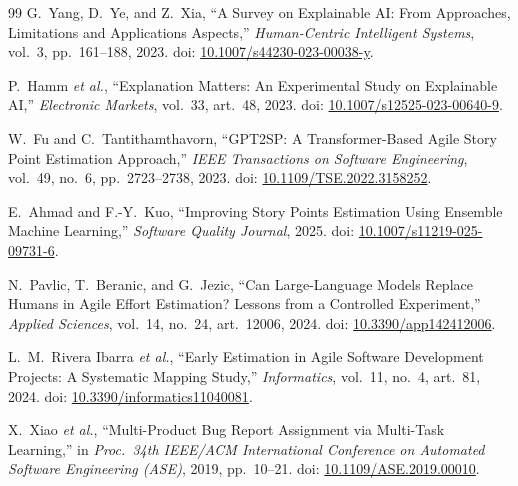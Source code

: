 \documentclass[conference]{IEEEtran}
\begin{document}
\begin{thebibliography}{99}
G.\ Yang, D.\ Ye, and Z.\ Xia,
``A Survey on Explainable AI: From Approaches, Limitations and Applications
Aspects,''
\emph{Human-Centric Intelligent Systems},
vol.~3, pp.~161--188, 2023.
doi: \href{https://doi.org/10.1007/s44230-023-00038-y}{10.1007/s44230-023-00038-y}.

P.\ Hamm \emph{et al.},
``Explanation Matters: An Experimental Study on Explainable AI,''
\emph{Electronic Markets},
vol.~33, art.~48, 2023.
doi: \href{https://doi.org/10.1007/s12525-023-00640-9}{10.1007/s12525-023-00640-9}.

W.\ Fu and C.\ Tantithamthavorn,
``GPT2SP: A Transformer-Based Agile Story Point Estimation Approach,''
\emph{IEEE Transactions on Software Engineering},
vol.~49, no.~6, pp.~2723--2738, 2023.
doi: \href{https://doi.org/10.1109/TSE.2022.3158252}{10.1109/TSE.2022.3158252}.

E.\ Ahmad and F.-Y.\ Kuo,
``Improving Story Points Estimation Using Ensemble Machine Learning,''
\emph{Software Quality Journal}, 2025.
doi: \href{https://doi.org/10.1007/s11219-025-09731-6}{10.1007/s11219-025-09731-6}.

N.\ Pavlic, T.\ Beranic, and G.\ Jezic,
``Can Large-Language Models Replace Humans in Agile Effort Estimation? Lessons from
a Controlled Experiment,''
\emph{Applied Sciences},
vol.~14, no.~24, art.~12006, 2024.
doi: \href{https://doi.org/10.3390/app142412006}{10.3390/app142412006}.

L.\ M.\ Rivera Ibarra \emph{et al.},
``Early Estimation in Agile Software Development Projects: A Systematic Mapping
Study,''
\emph{Informatics},
vol.~11, no.~4, art.~81, 2024.
doi: \href{https://doi.org/10.3390/informatics11040081}{10.3390/informatics11040081}.

X.\ Xiao \emph{et al.},
``Multi-Product Bug Report Assignment via Multi-Task Learning,''
in \emph{Proc.\ 34th IEEE/ACM International Conference on Automated Software
Engineering (ASE)}, 2019, pp.~10--21.
doi: \href{https://doi.org/10.1109/ASE.2019.00010}{10.1109/ASE.2019.00010}.

\end{thebibliography}
\end{document}

